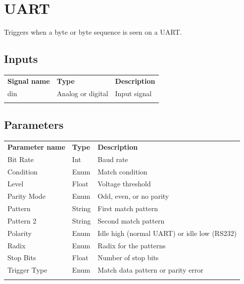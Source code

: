 \section{UART}

Triggers when a byte or byte sequence is seen on a UART.

\subsection{Inputs}

\begin{tabularx}{16cm}{llX}
\thickhline
\textbf{Signal name} & \textbf{Type} & \textbf{Description} \\
\thickhline
din & Analog or digital & Input signal \\
\thickhline
\end{tabularx}

\subsection{Parameters}

\begin{tabularx}{16cm}{llX}
\thickhline
\textbf{Parameter name} & \textbf{Type} & \textbf{Description} \\
\thickhline
Bit Rate & Int & Baud rate \\
\thinhline
Condition & Enum & Match condition \\
\thinhline
Level & Float & Voltage threshold\\
\thinhline
Parity Mode & Enum & Odd, even, or no parity \\
\thinhline
Pattern & String & First match pattern\\
\thinhline
Pattern 2 & String & Second match pattern \\
\thinhline
Polarity & Enum & Idle high (normal UART) or idle low (RS232)\\
\thinhline
Radix & Enum & Radix for the patterns\\
\thinhline
Stop Bits & Float & Number of stop bits\\
\thinhline
Trigger Type & Enum & Match data pattern or parity error\\
\thickhline
\end{tabularx}



